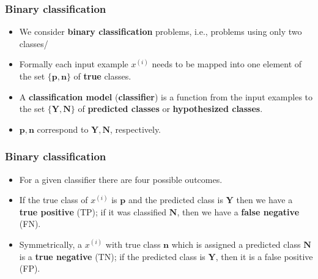 \documentclass[notes]{beamer}          %
\newcommand{\vect}[1]{\bm{#1}}
\begin{document}
\begin{frame}\frametitle{Binary classification}
    \begin{itemize}
        \item We consider {\bf binary classification} problems, i.e., problems using only two classes/
        \item Formally each input example $x^{(i)}$ needs to be mapped into one element of the set $\{\vect{p},\vect{n}\}$ of {\bf true} classes.
        \item A {\bf classification model} ({\bf classifier}) is a function from the input examples to the set $\{\vect{Y}, \vect{N}\}$ of {\bf predicted classes} or {\bf hypothesized classes}.
        \item $\vect{p},\vect{n}$ correspond to $\vect{Y},\vect{N}$, respectively.
    \end{itemize}
\end{frame}


\begin{frame}\frametitle{Binary classification}
    \begin{itemize}
        \item For a given classifier there are four possible outcomes.
        \item If the true class of $x^{(i)}$ is $\vect{p}$ and the predicted class is $\vect{Y}$ then we have a {\bf true positive} (TP); if it was classified $\vect{N}$, then we have a {\bf false negative} (FN).
        \item Symmetrically, a  $x^{(i)}$ with true class $\vect{n}$ which is assigned a predicted class $\vect{N}$ is a {\bf true negative} (TN); if the predicted class is $\vect{Y}$, then it is a false positive (FP).
    \end{itemize}
\end{frame}
\end{document}
